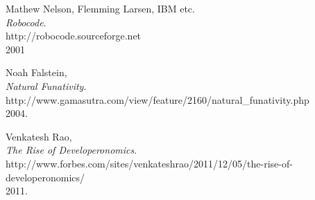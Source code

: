 \documentclass[12pt]{article}
\begin{document}
\begin{thebibliography}{9}

	Mathew Nelson, Flemming Larsen, IBM etc.\\
	\emph{Robocode}.\\
	http://robocode.sourceforge.net\\
	2001

	Noah Falstein,\\
	\emph{Natural Funativity}.\\
	http://www.gamasutra.com/view/feature/2160/natural\_funativity.php\\
	2004.

	Venkatesh Rao,\\
	\emph{The Rise of Developeronomics}.\\
	http://www.forbes.com/sites/venkateshrao/2011/12/05/the-rise-of-developeronomics/\\
	2011.

\end{thebibliography}

	
\end{document}

